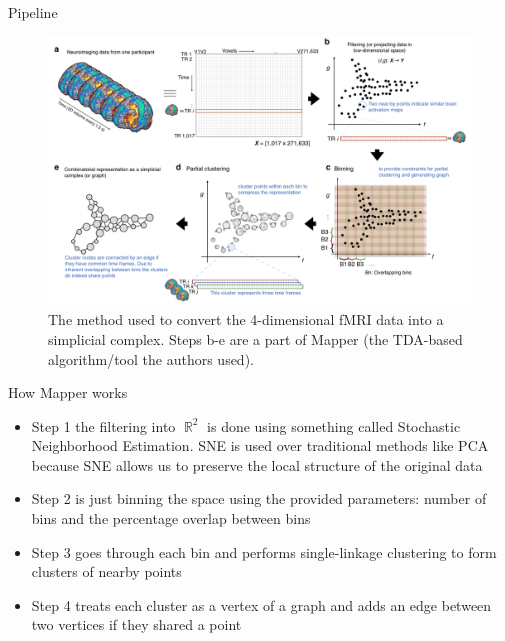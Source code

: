 \documentclass[handout]{beamer}
\DeclareMathOperator{\R}{\mathbb{R}}
\begin{document}
\begin{frame}{Pipeline}
    \begin{figure}
        \includegraphics[width = 0.75\linewidth]{fig1.png}
        \caption{The method used to convert the 4-dimensional fMRI data into a simplicial complex. Steps b-e are a part of Mapper (the TDA-based algorithm/tool the authors used).}
    \end{figure}
\end{frame}

\begin{frame}{How Mapper works}
    \begin{itemize}
        \item Step 1 the filtering into $\R^2$ is done using something called Stochastic Neighborhood Estimation. SNE is used over traditional methods like PCA because SNE allows us to preserve the local structure of the original data \pause %
        \item Step 2 is just binning the space using the provided parameters: number of bins and the percentage overlap between bins\pause
        \item Step 3 goes through each bin and performs single-linkage clustering to form clusters of nearby points\pause
        \item Step 4 treats each cluster as a vertex of a graph and adds an edge between two vertices if they shared a point\cite{mapper}
    \end{itemize}
\end{frame}
\end{document}
